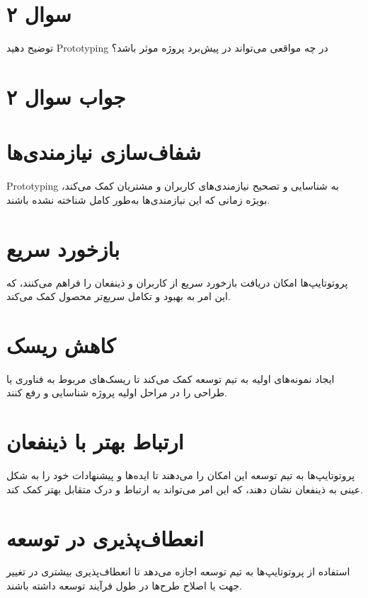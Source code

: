 \section*{سوال ۲}

توضیح دهید Prototyping در چه مواقعی می‌تواند در پیش‌برد پروژه موثر باشد؟

\section*{جواب سوال ۲}

\section*{شفاف‌سازی نیازمندی‌ها}
Prototyping به شناسایی و تصحیح نیازمندی‌های کاربران و مشتریان کمک می‌کند، بویژه زمانی که این نیازمندی‌ها به‌طور کامل شناخته نشده باشند.

\section*{بازخورد سریع}
پروتوتایپ‌ها امکان دریافت بازخورد سریع از کاربران و ذینفعان را فراهم می‌کنند، که این امر به بهبود و تکامل سریع‌تر محصول کمک می‌کند.

\section*{کاهش ریسک}
ایجاد نمونه‌های اولیه به تیم توسعه کمک می‌کند تا ریسک‌های مربوط به فناوری یا طراحی را در مراحل اولیه پروژه شناسایی و رفع کنند.

\section*{ارتباط بهتر با ذینفعان}
پروتوتایپ‌ها به تیم توسعه این امکان را می‌دهند تا ایده‌ها و پیشنهادات خود را به شکل عینی به ذینفعان نشان دهند، که این امر می‌تواند به ارتباط و درک متقابل بهتر کمک کند.

\section*{انعطاف‌پذیری در توسعه}
استفاده از پروتوتایپ‌ها به تیم توسعه اجازه می‌دهد تا انعطاف‌پذیری بیشتری در تغییر جهت یا اصلاح طرح‌ها در طول فرآیند توسعه داشته باشند.
